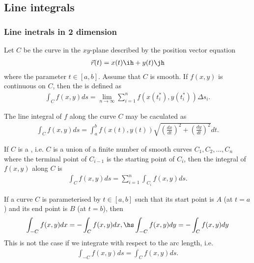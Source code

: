 \documentclass{article}
\begin{document}
\subsection{Line integrals}


\subsubsection{Line inetrals in 2 dimension}

\begin{definition}
    Let $C$ be the curve in the $xy$-plane described by the position vector equation
    \begin{align*}
        \vec r(t) = x(t)\ih + y(t)\jh
    \end{align*}
    where the parameter $t\in[a,b]$. Assume that $C$ is smooth. 
    If $f(x,y)$ is continuous on $C$, then the  is
    defined as
    \begin{align*}
        \int_C f(x,y) ds = \lim_{n\to\infty} \sum_{i=1}^n f(x(t_i^*), y(t_i^*))\Delta s_i.
    \end{align*}
\end{definition}
\begin{theorem}
    The line integral of $f$ along the curve $C$ may be caculated as
    \begin{align*}
        \int_C f(x,y)ds = \int_a^b f(x(t), y(t))\sqrt{\left(\frac{dx}{dt}\right)^2 + 
        \left(\frac{dy}{dt}\right)^2}dt.
    \end{align*}
\end{theorem}
\begin{theorem}
    If $C$ is a , i.e. $C$ is a union of a finite number of smooth
    curves $C_1, C_2, ..., C_n$ where the terminal point of $C_{i-1}$ is the starting point
    of $C_i$, then the integral of $f(x,y)$ along $C$ is
    \begin{align*}
        \int_C f(x,y)ds = \sum_{i=1}^n \int_{C_i} f(x,y)ds.
    \end{align*}
\end{theorem}
\begin{lemma}
    If a curve $C$ is parameterised by $t\in[a,b]$ such that its start point is $A$
    (at $t=a$) and its end point is $B$ (at $t=b$), then
    \begin{align*}
        \int_{-C} f(x,y)dx = -\int_C f(x,y)dx,\hs 
        \int_{-C}f(x,y)dy = -\int_C f(x,y)dy
    \end{align*}
    This is not the case if we integrate with respect to the arc length, i.e.
    \begin{align*}
        \int_{-C}f(x,y)ds = \int_C f(x,y)ds.
    \end{align*}
\end{lemma}
\end{document}
